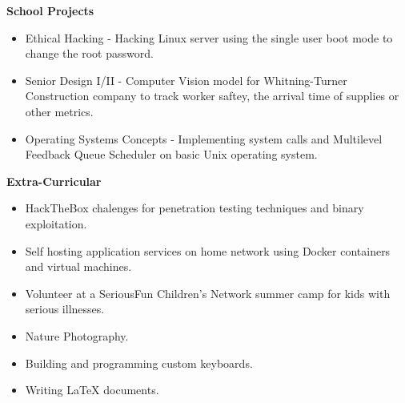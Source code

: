 \documentclass[12pt,a4paper]{article}
\begin{document}
\textbf{School Projects}
\begin{itemize}
    \item Ethical Hacking - Hacking Linux server using the single user boot mode to change the root password.
    \item Senior Design I/II - Computer Vision model for Whitning-Turner Construction company to track worker saftey, the arrival time of supplies or other metrics.
    \item Operating Systems Concepts - Implementing system calls and Multilevel Feedback Queue Scheduler on basic Unix operating system.
\end{itemize}

\textbf{Extra-Curricular}
\begin{itemize}
    \item HackTheBox chalenges for penetration testing techniques and binary exploitation.
    \item Self hosting application services on home network using Docker containers and virtual machines.
    \item Volunteer at a SeriousFun Children's Network summer camp for kids with serious illnesses.
    \item Nature Photography.
    \item Building and programming custom keyboards.
    \item Writing LaTeX documents.
\end{itemize}
\end{document}
